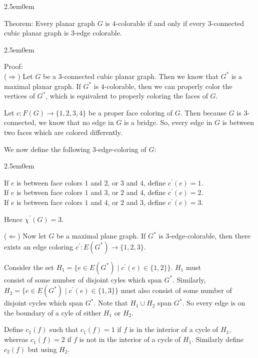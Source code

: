\documentclass{book}
\newcommand{\hTwo}{%
   \color{MidnightBlue}%
   \fontsize{13}{15}\selectfont%
}
\newcommand{\hThree}{%
   \color{PineGreen}
   \fontsize{13}{15}\selectfont%
}
\newenvironment{myIndent}{%
   \begin{adjustwidth}{2.5em}{0em}%
}{%
   \end{adjustwidth}%
}
\newcommand{\uuline}[2][.]{%
{\vphantom{a}\color{#1}%
\rlap{\rule[-0.18em]{\widthof{#2}}{0.06em}}%
\rlap{\rule[-0.32em]{\widthof{#2}}{0.06em}}}%
#2}
\newcommand{\retTwo}{\hfill\bigbreak}
\begin{document}
{\begin{myIndent} \hTwo
   \uuline{Theorem}: Every planar graph $G$ is $4$-colorable if and only if every $3$-connected cubic planar graph is $3$-edge colorable.

   {\begin{myIndent} \hThree
      Proof:\\
      ($\Longrightarrow$) Let $G$ be a $3$-connected cubic planar graph. Then we know that $G^*$ is a maximal planar graph. If $G^*$ is $4$-colorable, then we can properly color the vertices of $G^*$, which is equivalent to properly coloring the faces of $G$. \retTwo

      Let $c: F(G) \rightarrow \{1, 2, 3, 4\}$ be a proper face coloring of $G$. Then because $G$ is $3$-connected, we know that no edge in $G$ is a bridge. So, every edge in $G$ is between two faces which are colored differently.
      
      \newpage
      We now define the following $3$-edge-coloring of $G$:\\
      \begin{myIndent}
         If $e$ is between face colors $1$ and $2$, or $3$ and $4$, define $c^\prime(e) = 1$.\\
         If $e$ is between face colors $1$ and $3$, or $2$ and $4$, define $c^\prime(e) = 2$.\\
         If $e$ is between face colors $1$ and $4$, or $2$ and $3$, define $c^\prime(e) = 3$.\\
      \end{myIndent}

      Hence $\chi^\prime(G) = 3$. \retTwo \retTwo
      
      ($\Longleftarrow$) Now let $G$ be a maximal plane graph. If $G^*$ is $3$-edge-colorable, then there exists an edge coloring $c^\prime: E(G^*) \rightarrow \{1, 2, 3\}$. \retTwo

      Consider the set $H_1 = \{e \in E(G^*) \mid c^\prime(e) \in \{1, 2\}\}$. $H_1$ must\\ consist of some number of disjoint cyles which span $G^*$. Similarly,\\ $H_2 = \{e \in E(G^*) \mid c^\prime(e) \in \{1, 3\}\}$ must also consist of some number of\\ disjoint cycles which span $G^*$. Note that $H_1 \cup H_2$ span $G^*$. So every edge is on the boundary of a cyle of either $H_1$ or $H_2$.\retTwo

      Define $c_1(f)$ such that $c_1(f) = 1$ if $f$ is in the interior of a cycle of $H_1$, whereas $c_1(f) = 2$ if $f$ is not in the interior of a cycle of $H_1$. Similarly define $c_2(f)$ but using $H_2$. \retTwo


\end{myIndent}}
\end{myIndent}}
\end{document}
